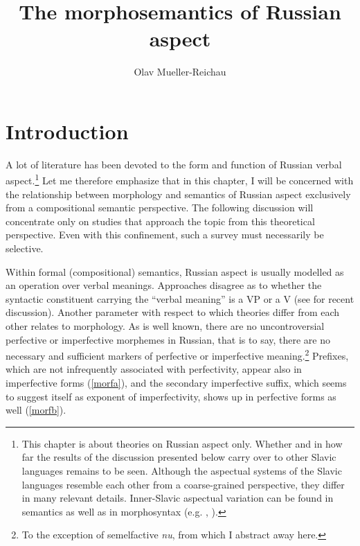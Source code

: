 \documentclass[output=paper,colorlinks,citecolor=brown]{langscibook}
\author{Olav Mueller-Reichau\affiliation{University of Leipzig}}
\title{The morphosemantics of Russian aspect}
\begin{document}
\maketitle

\section{Introduction} 
A lot of literature has been devoted to the form and function of Russian verbal aspect.\footnote{This chapter is about theories on Russian aspect only. Whether and in how far the results of the discussion presented below carry over to other Slavic languages remains to be seen. Although the aspectual systems of the Slavic languages resemble each other from a coarse-grained perspective, they differ in many relevant details. Inner-Slavic aspectual variation can be found in semantics as well as in morphosyntax (e.g. \citealt{Dickey2000}, \citealt{Petruchina12}).} Let me therefore emphasize that in this  
chapter, I will be concerned with the relationship between morphology and semantics of Russian aspect exclusively from a compositional semantic perspective. 
The following discussion will concentrate only on studies that approach the topic from this theoretical perspective. Even with this confinement, such a survey must necessarily be selective.  


Within formal (compositional) semantics, Russian aspect is usually modelled as an operation over verbal meanings. Approaches disagree as to whether the syntactic constituent carrying the ``verbal meaning'' is a VP or a V (see \citealt{Rothstein20} for recent discussion). Another parameter with respect to which theories differ from each other relates to morphology. As is well known, there are no uncontroversial perfective or imperfective morphemes in Russian, that is to say, there are no necessary and sufficient markers of perfective or imperfective meaning.\footnote{To the exception of semelfactive \textit{nu}, from which I abstract away here.} Prefixes, which are not infrequently associated with perfectivity, appear also in imperfective forms (\ref{morfa}), and the secondary imperfective suffix, which seems to suggest itself as exponent of imperfectivity, shows up in perfective forms as well (\ref{morfb}).
\end{document}
